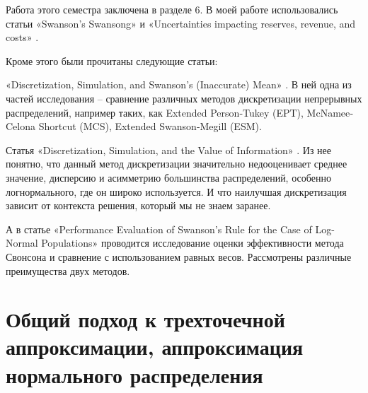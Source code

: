 \documentclass[12pt]{article}
\begin{document}
	Работа этого семестра заключена в разделе 6. В моей работе использовались статьи «Swanson's Swansong» \cite{Swansong} и «Uncertainties impacting reserves, revenue, and costs» \cite{Uncertainties}.
	
	Кроме этого были прочитаны следующие статьи:
	
	«Discretization, Simulation, and Swanson's (Inaccurate) Mean» \cite{Discretization}. В ней одна из частей исследования -- сравнение различных методов дискретизации непрерывных распределений, например таких, как Extended Person‐Tukey (EPT), McNamee‐Celona Shortcut (MCS), Extended Swanson‐Megill (ESM).
	
	Статья «Discretization, Simulation, and the Value of Information» \cite{Simulation}.
	Из нее понятно, что данный метод дискретизации значительно недооценивает среднее значение, дисперсию и асимметрию большинства распределений, особенно логнормального, где он широко используется. И что наилучшая дискретизация зависит от контекста решения, который мы не знаем заранее.
	
	А в статье «Performance Evaluation of Swanson’s Rule for the Case of Log-Normal Populations» \cite{Performance} проводится исследование оценки эффективности метода Свонсона и сравнение с использованием равных весов. Рассмотрены различные преимущества двух методов.
	
	\section{Общий подход к трехточечной аппроксимации, аппроксимация нормального распределения}
	
\end{document}
